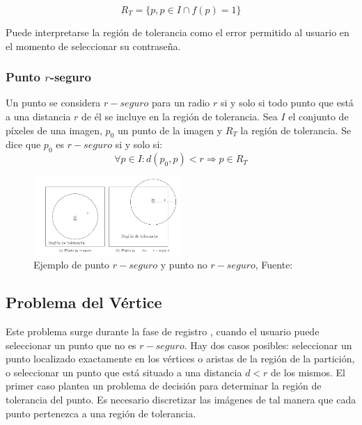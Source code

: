 \begin{equation}
	R_T = \{p, p \in I \cap f(p) = 1\} \label{eq:region_tolerancia}
\end{equation}

Puede interpretarse la región de tolerancia como el error permitido al usuario en el momento de seleccionar su contraseña.

\subsubsection{Punto \texorpdfstring{$r$}{r}-seguro}
Un punto se considera $r-seguro$ \cite{legon2019nuevo,  borrego2018debilidades} para un radio \(r\) si y solo si todo punto que está a una distancia \(r\) de él se incluye en la región de tolerancia. Sea \(I\) el conjunto de píxeles de una imagen, \(p_0\) un punto de la imagen y \(R_T\) la región de tolerancia. Se dice que \(p_0\) es $r-seguro$ si y solo si:
\begin{equation}
	\forall p \in I: d(p_0, p) < r \Rightarrow p \in R_T \label{eq:r_seguro}
\end{equation}
		
\begin{figure}[h]
			\centering
			\includegraphics[width=0.5\textwidth]{punto-r-seguro.png}			
			\caption{Ejemplo de punto $r-seguro$ y punto no $r-seguro$, Fuente: \cite{legon2019nuevo} }
		\end{figure}
		
	
\subsection{Problema del Vértice}
Este problema surge durante la fase de registro \cite{legon2019nuevo, birget2006graphical, borrego2018debilidades}, cuando el usuario puede seleccionar un punto que no es $r-seguro$. Hay dos casos posibles: seleccionar un punto localizado exactamente en los vértices o aristas de la región de la partición, o seleccionar un punto que está situado a una distancia \(d < r\) de los mismos. El primer caso plantea un problema de decisión para determinar la región de tolerancia del punto. Es necesario discretizar las imágenes de tal manera que cada punto pertenezca a una región de tolerancia.
	
